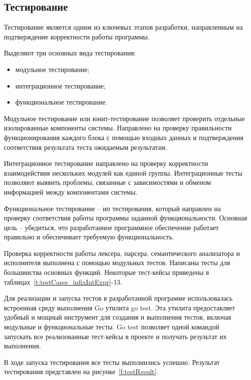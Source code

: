 \subsection{Тестирование}

Тестирование является одним из ключевых этапов разработки, направленным на подтверждение корректности работы программы.

Выделяют три основных вида тестирования:
\begin{itemize}
    \item модульное тестирование;
    \item интеграционное тестирование;
    \item функциональное тестирование.
\end{itemize}

Модульное тестирование или юнит-тестирование позволяет проверить отдельные изолированные компоненты системы.
Направлено на проверку правильности функционирования каждого блока с помощью входных данных и подтверждения соответствия результата теста ожидаемым результатам.

Интеграционное тестирование направлено на проверку корректности взаимодействия нескольких модулей как единой группы.
Интеграционные тесты позволяют выявить проблемы, связанные с зависимостями и обменом информацией между компонентами системы.

Функциональное тестирование -- ип тестирования, который направлен на проверку соответствия работы программы заданной функциональности.
Основная цель -- убедиться, что разработанное программное обеспечение работает правильно и обеспечивает требуемую функциональность.

Проверка корректности работы лексера, парсера, семантического анализатора и исполнителя выполнена с помощью модульных тестов.
Написаны тесты для большинства основных функций.
Некоторые тест-кейсы приведены в таблицах~\ref{t:testCases_infixIntExpr}-13.

Для реализации и запуска тестов в разработанной программе использовалась встроенная среду выполнения Go утилита go test.
Эта утилита предоставляет удобный и мощный инструмент для создания и выполнения тестов, включая модульные и функциональные тесты.
Go test позволяет одной командой запускать все реализованные тест-кейсы в проекте и получать результат их выполнения.


В ходе запуска тестирования все тесты выполнились успешно. Результат тестирования представлен на рисунке~\ref{f:testResult}.


